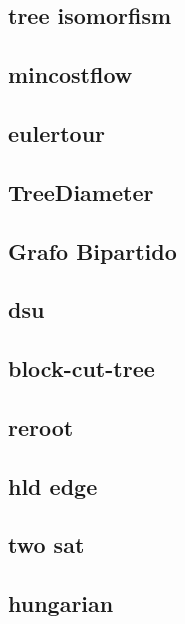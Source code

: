 \subsection{tree isomorfism}
\raggedbottom
\hrulefill
\subsection{mincostflow}
\raggedbottom
\hrulefill
\subsection{eulertour}
\raggedbottom
\hrulefill
\subsection{TreeDiameter}
\raggedbottom
\hrulefill
\subsection{Grafo Bipartido}
\raggedbottom
\hrulefill
\subsection{dsu}
\raggedbottom
\hrulefill
\subsection{block-cut-tree}
\raggedbottom
\hrulefill
\subsection{reroot}
\raggedbottom
\hrulefill
\subsection{hld edge}
\raggedbottom
\hrulefill
\subsection{two sat}
\raggedbottom
\hrulefill
\subsection{hungarian}
\raggedbottom
\hrulefill
